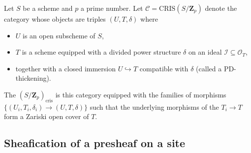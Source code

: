 










\begin{definition}
    \TODO{}
Let $S$ be a scheme and $p$ a prime number. 
Let $\mathcal{C}=\mathrm{CRIS}(S/\mathbf{Z}_p)$ denote the category whose objects are triples $(U,T,\delta)$ where 
\begin{itemize}
    \item $U$ is an open subscheme of $S$,
    \item $T$ is a scheme equipped with a divided power structure $\delta$ on an ideal $\mathcal{I} \subseteq \mathcal{O}_T$,
    \item together with a closed immersion $U \hookrightarrow T$ compatible with $\delta$ (called a PD-thickening).
\end{itemize}
The  $(S/\mathbf{Z}_p)_{\mathrm{cris}}$ is this category equipped with the   families of morphisms $\{(U_i,T_i,\delta_i) \to (U,T,\delta)\}$ such that the underlying morphisms of the $T_i \to T$ form a Zariski open cover of $T$.
\end{definition}




\subsection{Sheafication of a presheaf on a site}

